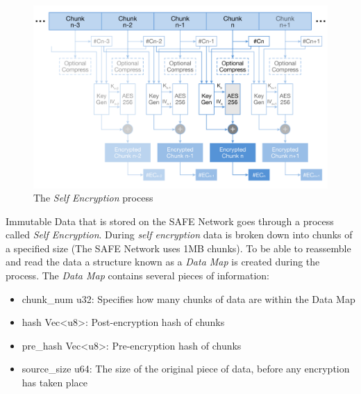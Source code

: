 \begin{figure}[h]
	\begin{center}
		\includegraphics[width=\textwidth]{diagrams/self-encryption}
		\caption{The \textit{Self Encryption} process \protect\footnotemark}
		\label{fig:self-encryption}
	\end{center}
\end{figure}


Immutable Data that is stored on the SAFE Network goes through a process called \textit{Self Encryption}\cite{irvine2010self}. During \textit{self encryption} data is broken down into chunks of a specified size (The SAFE Network uses 1MB chunks). To be able to reassemble and read the data a structure known as a \textit{Data Map} is created during the process. The \textit{Data Map} contains several pieces of information:

\begin{itemize}
	\item chunk\_num u32: Specifies how many chunks of data are within the Data Map
	\item hash Vec\textless u8\textgreater: Post-encryption hash of chunks
	\item pre\_hash Vec\textless u8\textgreater: Pre-encryption hash of chunks
	\item source\_size u64: The size of the original piece of data, before any encryption has taken place
\end{itemize}

